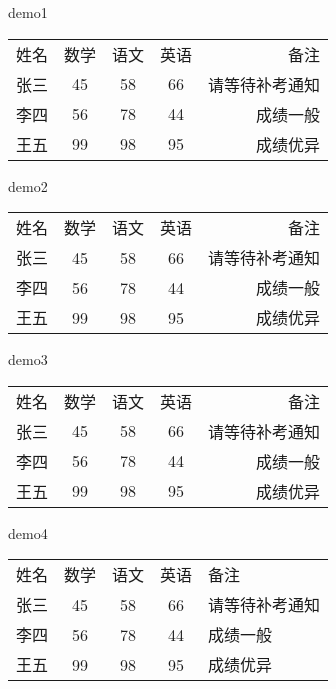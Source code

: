 \documentclass[UTF8]{ctexrep}
\begin{document}
\par demo1

\begin{tabular}{l c c c r}
        姓名 & 数学 & 语文 & 英语 & 备注
    \\  张三 & 45 & 58 & 66 & 请等待补考通知
    \\  李四 & 56 & 78 & 44 & 成绩一般
    \\  王五 & 99 & 98 & 95 & 成绩优异
    \end{tabular}

\par demo2

\begin{tabular}{l|c c c |r}
    \hline
    姓名 & 数学 & 语文 & 英语 & 备注
\\  张三 & 45 & 58 & 66 & 请等待补考通知
\\  李四 & 56 & 78 & 44 & 成绩一般
\\  王五 & 99 & 98 & 95 & 成绩优异
\\  \hline
\end{tabular}

\par demo3

\begin{tabular}{l||c c c||r}
    \hline \hline
    姓名 & 数学 & 语文 & 英语 & 备注
\\  张三 & 45 & 58 & 66 & 请等待补考通知
\\  李四 & 56 & 78 & 44 & 成绩一般
\\  王五 & 99 & 98 & 95 & 成绩优异
\\  \hline \hline
\end{tabular}

\par demo4

\begin{tabular}{l|c|c|c|p{2cm}}
    姓名 & 数学 & 语文 & 英语 & 备注
\\  张三 & 45 & 58 & 66 & 请等待补考通知
\\  李四 & 56 & 78 & 44 & 成绩一般
\\  王五 & 99 & 98 & 95 & 成绩优异
\end{tabular}
\end{document}
